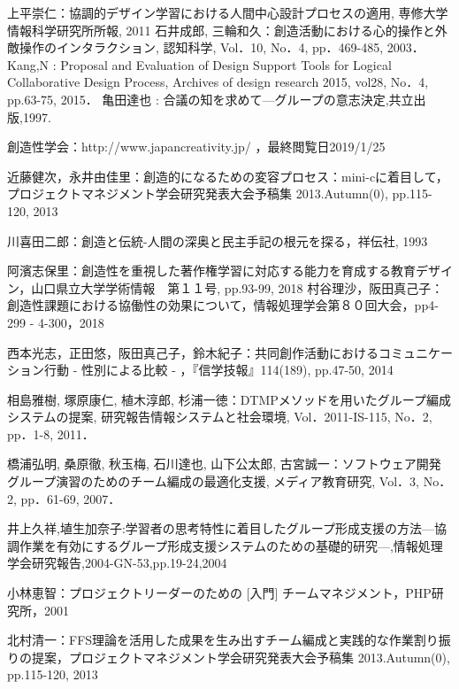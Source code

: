 \documentclass{funthesis}
\begin{document}
\begin{thebibliography}{9}
  上平崇仁：協調的デザイン学習における人間中心設計プロセスの適用, 専修大学情報科学研究所所報, 2011
石井成郎, 三輪和久：創造活動における心的操作と外敵操作のインタラクション, 認知科学, Vol．10, No．4, pp．469-485, 2003．
Kang,N : Proposal and Evaluation of Design
Support Tools for Logical Collaborative Design Process, Archives of design research 2015, vol28, No．4, pp.63-75, 2015．
亀田達也 : 合議の知を求めて—グループの意志決定,共立出版,1997.

創造性学会：http://www.japancreativity.jp/ ，最終閲覧日2019/1/25

近藤健次，永井由佳里：創造的になるための変容プロセス：mini-cに着目して，プロジェクトマネジメント学会研究発表大会予稿集 2013.Autumn(0), pp.115-120, 2013

川喜田二郎：創造と伝統-人間の深奥と民主手記の根元を探る，祥伝社, 1993

阿濱志保里：創造性を重視した著作権学習に対応する能力を育成する教育デザイン，山口県立大学学術情報　第１１号, pp.93-99, 2018
村谷理沙，阪田真己子：創造性課題における協働性の効果について，情報処理学会第８０回大会，pp4-299 - 4-300，2018

西本光志，正田悠，阪田真己子，鈴木紀子：共同創作活動におけるコミュニケーション行動 - 性別による比較 - ，『信学技報』114(189), pp.47-50, 2014

相島雅樹, 塚原康仁, 植木淳郎, 杉浦一徳：DTMPメソッドを用いたグループ編成システムの提案, 研究報告情報システムと社会環境, Vol．2011-IS-115, No．2, pp．1-8, 2011．

橋浦弘明, 桑原徹, 秋玉梅, 石川達也, 山下公太郎, 古宮誠一：ソフトウェア開発グループ演習のためのチーム編成の最適化支援, メディア教育研究, Vol．3, No．2, pp．61-69, 2007． 

井上久祥,埴生加奈子:学習者の思考特性に着目したグループ形成支援の方法—協調作業を有効にするグループ形成支援システムのための基礎的研究—,情報処理学会研究報告,2004-GN-53,pp.19-24,2004

小林恵智：プロジェクトリーダーのための [入門] チームマネジメント，PHP研究所，2001

北村清一：FFS理論を活用した成果を生み出すチーム編成と実践的な作業割り振りの提案，プロジェクトマネジメント学会研究発表大会予稿集 2013.Autumn(0), pp.115-120, 2013


\end{thebibliography}
\end{document}
